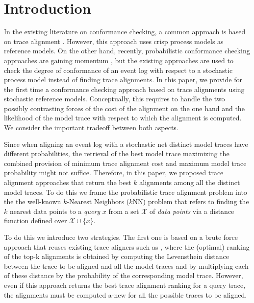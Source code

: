 
\section{Introduction}
\label{introduction}


In the existing literature on conformance checking, a common approach is based on trace alignment \cite{DBLP:conf/edoc/AdriansyahDA11}. However, this approach uses crisp process models as reference models. On the other hand, recently, probabilistic conformance checking approaches are gaining momentum \cite{DBLP:conf/bpm/LeemansSA19,DBLP:conf/icpm/PolyvyanyyK19,DBLP:journals/tosem/PolyvyanyySWCM20}, but
the existing approaches are used to check the degree of conformance of an event log with respect to a stochastic process model
instead of finding trace alignments.
In this paper, we provide for the first time a conformance checking approach based on trace alignments using stochastic reference
models. Conceptually, this requires to handle the two possibly contrasting forces of the cost of the alignment on the one hand and the
likelihood of the model trace with respect to which the alignment is computed. We consider the important tradeoff between both
aspects.



Since when aligning an event log with a stochastic net distinct model traces have different probabilities, the retrieval of the best model trace maximizing the combined provision of minimum trace alignment cost and maximum model trace probability might not suffice. Therefore, in this paper, we proposed trace alignment approaches that return the best $k$ alignments among all the distinct model traces. To do this we frame the probabilistic trace alignment problem into the the well-known $k$-Nearest Neighbors ($k$NN) problem \cite{Altman} that refers to finding the $k$ nearest data points to a \textit{query} $x$ from a set $\mathcal{X}$ of \textit{data points} via a distance function defined over $\mathcal{X}\cup\{x\}$.

To do this we introduce two strategies. The first one is based on a brute force approach that reuses existing trace aligners such as \cite{DBLP:conf/edoc/AdriansyahDA11,LeoniM17}, where the (optimal) ranking of the top-k alignments is obtained by computing the Levensthein distance between the trace to be aligned and all the model traces and by multiplying each of these distance by the probability of the corresponding model trace. However, even if this approach returns the best trace alignment ranking for a query trace, the alignments must be computed a-new for all the possible traces to be aligned.

